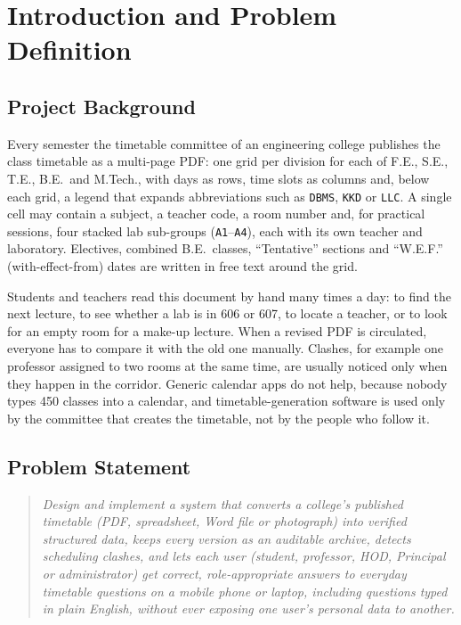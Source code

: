 \section{Introduction and Problem Definition}

\subsection{Project Background}
Every semester the timetable committee of an engineering college publishes the class timetable as a
multi-page PDF: one grid per division for each of F.E., S.E., T.E., B.E.\ and M.Tech., with days as
rows, time slots as columns and, below each grid, a legend that expands abbreviations such as
\texttt{DBMS}, \texttt{KKD} or \texttt{LLC}. A single cell may contain a subject, a teacher code, a
room number and, for practical sessions, four stacked lab sub-groups (\texttt{A1}--\texttt{A4}), each
with its own teacher and laboratory. Electives, combined B.E.\ classes, ``Tentative'' sections and
``W.E.F.'' (with-effect-from) dates are written in free text around the grid.

Students and teachers read this document by hand many times a day: to find the next lecture, to see
whether a lab is in 606 or 607, to locate a teacher, or to look for an empty room for a make-up
lecture. When a revised PDF is circulated, everyone has to compare it with the old one manually.
Clashes, for example one professor assigned to two rooms at the same time, are usually noticed only
when they happen in the corridor. Generic calendar apps do not help, because nobody types 450 classes
into a calendar, and timetable-generation software is used only by the committee that creates the
timetable, not by the people who follow it.

\subsection{Problem Statement}
\begin{quote}
\emph{Design and implement a system that converts a college's published timetable (PDF, spreadsheet,
Word file or photograph) into verified structured data, keeps every version as an auditable archive,
detects scheduling clashes, and lets each user (student, professor, HOD, Principal or administrator)
get correct, role-appropriate answers to everyday timetable questions on a mobile phone or laptop,
including questions typed in plain English, without ever exposing one user's personal data to
another.}
\end{quote}

